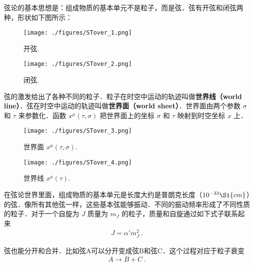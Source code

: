 
\begin{issues}
\issueNeedCite
\issueMissDepend
\end{issues}

弦论的基本思想是：组成物质的基本单元不是粒子，而是弦．弦有开弦和闭弦两种，形状如下图所示：
\begin{figure}[ht]
\centering
\texttt{[image: ./figures/STover\_1.png]}
\caption{开弦.} \label{STover_fig1}
\end{figure}
\begin{figure}[ht]
\centering
\texttt{[image: ./figures/STover\_2.png]}
\caption{闭弦.} \label{STover_fig2}
\end{figure}
弦的激发给出了各种不同的粒子．粒子在时空中运动的轨迹叫做\textbf{世界线（world line）}．弦在时空中运动的轨迹叫做\textbf{世界面（world sheet）}．世界面由两个参数 $\sigma$ 和 $\tau$ 来参数化．函数 $x^\mu(\tau,\sigma)$ 把世界面上的坐标 $\sigma$ 和 $\tau$ 映射到时空坐标 $x$ 上．

\begin{figure}[ht]
\centering
\texttt{[image: ./figures/STover\_3.png]}
\caption{世界面 $x^\mu (\tau,\sigma)$.} \label{STover_fig3}
\end{figure}

\begin{figure}[ht]
\centering
\texttt{[image: ./figures/STover\_4.png]}
\caption{世界线 $x^\mu(\tau)$.} \label{STover_fig4}
\end{figure}

在弦论世界里面，组成物质的基本单元是长度大约是普朗克长度（$10^{-33}\Si{cm}$）的弦．像所有其他弦一样，这些基本弦能够振动．不同的振动频率形成了不同性质的粒子．对于一个自旋为 $J$ 质量为 $m_J$ 的粒子，质量和自旋通过如下式子联系起来
\begin{align}
J = \alpha' m_J^2~.
\end{align}

弦也能分开和合并．比如弦A可以分开变成弦B和弦C．这个过程对应于粒子衰变
\begin{align}
A \rightarrow B + C~.
\end{align}


